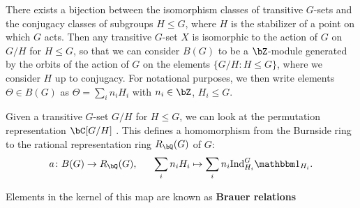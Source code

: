 There exists a bijection between the isomorphism classes of transitive $G$-sets and the conjugacy classes of subgroups $H \leq G$, where $H$ is the stabilizer of a point on which $G$ acts. Then any transitive $G$-set $X$ is isomorphic to the action of $G$ on $G/H$ for $H \leq G$, so that we can consider $B(G)$ to be a $\bZ$-module generated by the orbits of the action of $G$ on the elements $\{G/H : H \leq G\}$, where we consider $H$ up to conjugacy. For notational purposes, we then write elements $\Theta \in B(G)$ as $\Theta = \sum_i n_i H_i$ with $n_i \in \bZ$, $H_i \leq G$.

Given a transitive $G$-set $G/H$ for $H\leq G$, we can look at the permutation representation $\bC[G/H]$ . This defines a homomorphism from the Burnside ring to the rational representation ring $R_{\bQ}(G)$ of $G$: 
\[ a \colon B(G) \to R_{\bQ}(G),  \ \ \ \ \ \sum_i n_i H_i \mapsto \sum_i n_i \Ind_{H_i}^G \trivial_{H_i}. \]

Elements in the kernel of this map are known as \textbf{Brauer relations}